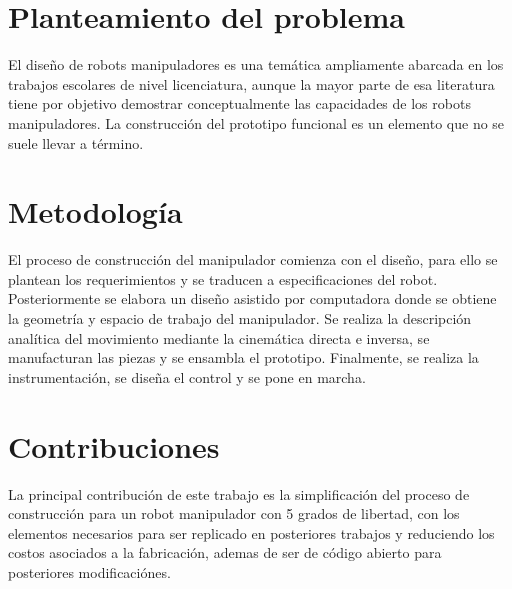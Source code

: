 
\section{Planteamiento del problema}

El diseño de robots manipuladores es una temática ampliamente abarcada en los trabajos escolares de nivel licenciatura, aunque la mayor parte de esa literatura tiene por objetivo demostrar conceptualmente las capacidades de los robots manipuladores. La construcción del prototipo funcional es un elemento que no se suele llevar a término.

\section{Metodología}

El proceso de construcción del manipulador comienza con el diseño, para ello se plantean los requerimientos y se traducen a especificaciones del robot. Posteriormente se elabora un diseño asistido por computadora donde se obtiene la geometría y espacio de trabajo del manipulador. Se realiza la descripción analítica del movimiento mediante la cinemática directa e inversa, se manufacturan las piezas y se ensambla el prototipo. Finalmente, se realiza la instrumentación, se diseña el control y se pone en marcha. %


\section{Contribuciones}

La principal contribución de este trabajo es la simplificación del proceso de construcción para un robot manipulador con 5 grados de libertad, con los elementos necesarios para ser replicado en posteriores trabajos y reduciendo los costos asociados a la fabricación, ademas de ser de código abierto para posteriores modificaciónes.

